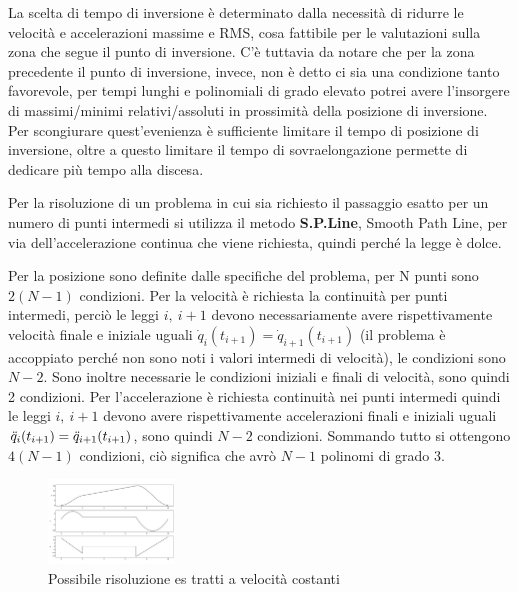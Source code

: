 La scelta di tempo di inversione è determinato dalla necessità di ridurre le velocità e accelerazioni massime e RMS, cosa fattibile per le valutazioni sulla zona che segue il punto di inversione. C'è tuttavia da notare che per la zona precedente il punto di inversione, invece, non è detto ci sia una condizione tanto favorevole, per tempi lunghi e polinomiali di grado elevato potrei avere l'insorgere di massimi/minimi relativi/assoluti in prossimità della posizione di inversione. Per scongiurare quest'evenienza è sufficiente limitare il tempo di posizione di inversione, oltre a questo limitare il tempo di sovraelongazione permette di dedicare più tempo alla discesa.

Per la risoluzione di un problema in cui sia richiesto il passaggio esatto per un numero di punti intermedi si utilizza il metodo \textbf{S.P.Line}, Smooth Path Line, per via dell'accelerazione continua che viene richiesta, quindi perché la legge è dolce.

Per la posizione sono definite dalle specifiche del problema, per N punti sono \(2(N-1)\) condizioni. Per la velocità è richiesta la continuità per punti intermedi, perciò le leggi \(i, \ i+1\) devono necessariamente avere rispettivamente velocità finale e iniziale uguali \(\dot{q}_i(t_{i+1})=\dot{q}_{i+1}(t_{i+1})\) (il problema è accoppiato perché non sono noti i valori intermedi di velocità), le condizioni sono \(N-2\). Sono inoltre necessarie le condizioni iniziali e finali di velocità, sono quindi 2 condizioni. Per l'accelerazione è richiesta continuità nei punti intermedi quindi le leggi \(i, \ i+1\) devono avere rispettivamente accelerazioni finali e iniziali uguali \(\Ddot{q}_i(t_{i+1})=\Ddot{q}_{i+1}(t_{i+1})\), sono quindi \(N-2\) condizioni.
Sommando tutto si ottengono \(4(N-1)\) condizioni, ciò significa che avrò \(N-1\) polinomi di grado 3. 

\begin{figure}[h]
    \centering
    \includegraphics[width=0.3\textwidth]{Immagini/tratti_vel_cost.png}
    \caption{Possibile risoluzione es tratti a velocità costanti}
\end{figure}

